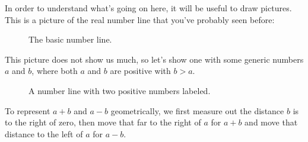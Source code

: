 In order to understand what's going on here, it will be useful to draw  pictures. This is a picture of the real number line that you've probably seen before:\\
\vspace{.2in}
\begin{figure}[h]
\centering
{}
\caption{The basic number line.}
\end{figure}

This picture does not show us much, so let's show one with some generic numbers $a$ and $b$, where both $a$ and $b$ are positive with $b>a$.
\vspace{.2in}
\begin{figure}[h]
\centering
{}
\caption{A number line with two  positive numbers labeled.}
\end{figure}

To represent $a+b$ and $a-b$ geometrically, we first measure out the distance $b$ is to the right of zero, then move that far to the right of $a$ for $a+b$ and move that distance to the left of $a$ for $a-b$.

